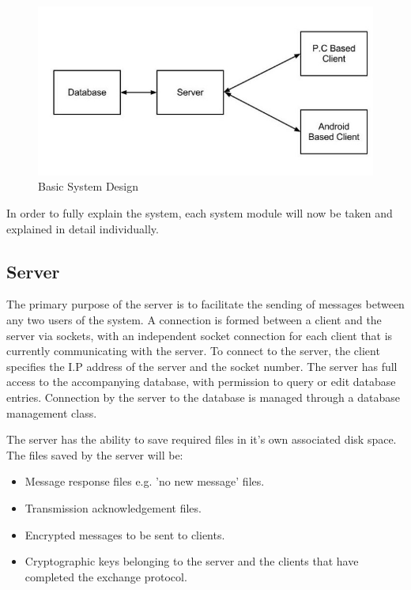 \documentclass[a4paper,12pt]{report}
\begin{document}
\begin{figure}[htb]
\centering
\includegraphics[scale=0.4]{images/mainsystem1.jpg}
\caption{Basic System Design}
\label{fig:mainsystem1}
\end{figure}

In order to fully explain the system, each system module will now be taken and explained in detail individually. 

\subsection{Server}

The primary purpose of the server is to facilitate the sending of messages between any two users of the system. A connection is formed between a client and the server via sockets, with an independent socket connection for each client that is currently communicating with the server. To connect to the server, the client specifies the I.P address of the server and the socket number. The server has full access to the accompanying database, with permission to query or edit database entries. Connection by the server to the database is managed through a database management class. 

The server has the ability to save required files in it's own associated disk space. The files saved by the server will be:

\begin{itemize}
 \item Message response files e.g. 'no new message' files.
 \item Transmission acknowledgement files.
 \item Encrypted messages to be sent to clients.
 \item Cryptographic keys belonging to the server and the clients that have completed the exchange protocol. 
\end{itemize}
\end{document}
